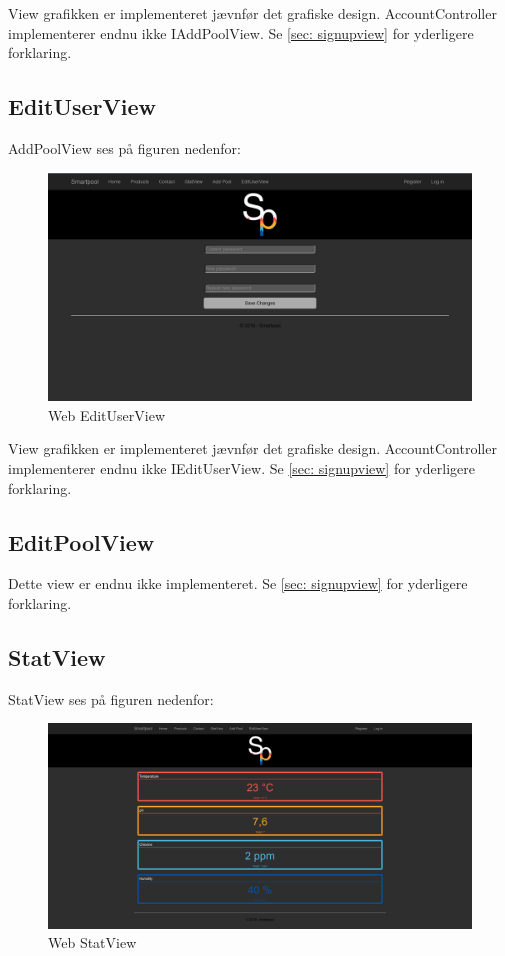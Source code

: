 View grafikken er implementeret jævnfør det grafiske design. AccountController implementerer endnu ikke IAddPoolView. Se \ref{sec: signupview} for yderligere forklaring.

\subsection{EditUserView}
AddPoolView ses på figuren nedenfor:

\begin{figure}
	\centering
	\includegraphics[width=1.0\linewidth]{figs/implementering/web_edituserview}
	\caption{Web EditUserView}
	\label{fig:webedituserview}
\end{figure}

View grafikken er implementeret jævnfør det grafiske design. AccountController implementerer endnu ikke IEditUserView. Se \ref{sec: signupview} for yderligere forklaring.

\subsection{EditPoolView}
Dette view er endnu ikke implementeret. Se \ref{sec: signupview} for yderligere forklaring.

\subsection{StatView}
StatView ses på figuren nedenfor:

\begin{figure}
	\centering
	\includegraphics[width=1.0\linewidth]{figs/implementering/web_statview}
	\caption{Web StatView}
	\label{fig:webstatview}
\end{figure}

